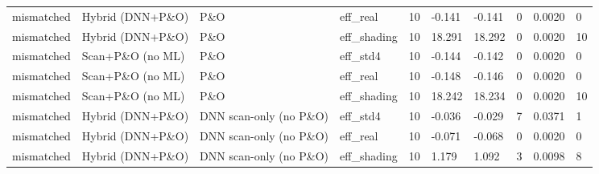 \begin{table}[t]
\begin{tabular}{llllllllll}
mismatched & Hybrid (DNN+P\&O) & P\&O & eff\_real & 10 & -0.141 & -0.141 & 0 & 0.0020 & 0 \\
mismatched & Hybrid (DNN+P\&O) & P\&O & eff\_shading & 10 & 18.291 & 18.292 & 0 & 0.0020 & 10 \\
mismatched & Scan+P\&O (no ML) & P\&O & eff\_std4 & 10 & -0.144 & -0.142 & 0 & 0.0020 & 0 \\
mismatched & Scan+P\&O (no ML) & P\&O & eff\_real & 10 & -0.148 & -0.146 & 0 & 0.0020 & 0 \\
mismatched & Scan+P\&O (no ML) & P\&O & eff\_shading & 10 & 18.242 & 18.234 & 0 & 0.0020 & 10 \\
mismatched & Hybrid (DNN+P\&O) & DNN scan-only (no P\&O) & eff\_std4 & 10 & -0.036 & -0.029 & 7 & 0.0371 & 1 \\
mismatched & Hybrid (DNN+P\&O) & DNN scan-only (no P\&O) & eff\_real & 10 & -0.071 & -0.068 & 0 & 0.0020 & 0 \\
mismatched & Hybrid (DNN+P\&O) & DNN scan-only (no P\&O) & eff\_shading & 10 & 1.179 & 1.092 & 3 & 0.0098 & 8 \\
\hline
\end{tabular}
\end{table}
